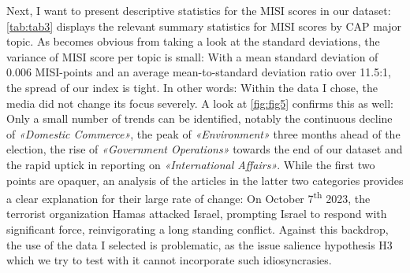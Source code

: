 \documentclass[11pt,a4paper]{article}
\begin{document}
Next, I want to present descriptive statistics for the MISI scores in our dataset: \autoref{tab:tab3} displays the relevant summary statistics for MISI scores by CAP major topic. As becomes obvious from taking a look at the standard deviations, the variance of MISI score per topic is small: With a mean standard deviation of 0.006 MISI-points and an average mean-to-standard deviation ratio over 11.5:1, the spread of our index is tight. In other words: Within the data I chose, the media did not change its focus severely. A look at \autoref{fig:fig5} confirms this as well: Only a small number of trends can be identified, notably the continuous decline of \textit{«Domestic Commerce»}, the peak of \textit{«Environment»} three months ahead of the election, the rise of \textit{«Government Operations»} towards the end of our dataset and the rapid uptick in reporting on \textit{«International Affairs»}. While the first two points are opaquer, an analysis of the articles in the latter two categories provides a clear explanation for their large rate of change: On October 7\textsuperscript{th} 2023, the terrorist organization Hamas attacked Israel, prompting Israel to respond with significant force, reinvigorating a long standing conflict. Against this backdrop, the use of the data I selected is problematic, as the issue salience hypothesis H3 which we try to test with it cannot incorporate such idiosyncrasies.
\end{document}
